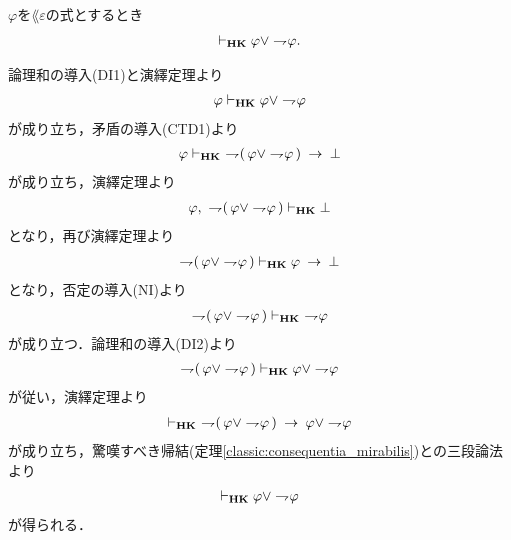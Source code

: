 	\begin{screen}
		\begin{thm}[排中律]\label{classic:law_of_excluded_middle}
			$\varphi$を$\lang{\varepsilon}$の式とするとき
			\begin{align}
				\vdash_{{\scriptsize \mbox{{\bf HK}}}} \varphi \vee \rightharpoondown\hspace{-0.25em} \varphi.
			\end{align}
		\end{thm}
	\end{screen}
	
	\begin{sketch}
		論理和の導入(DI1)と演繹定理より
		\begin{align}
			\varphi \vdash_{{\scriptsize \mbox{{\bf HK}}}} \varphi \vee \rightharpoondown\hspace{-0.25em} \varphi
		\end{align}
		が成り立ち，矛盾の導入(CTD1)より
		\begin{align}
			\varphi \provable{\mbox{{\bf HK}}}\ 
			\negation (\, \varphi \vee \negation \varphi\, ) \rarrow \bot
		\end{align}
		が成り立ち，演繹定理より
		\begin{align}
			\varphi,\ \rightharpoondown\hspace{-0.25em} (\, \varphi \vee \rightharpoondown\hspace{-0.25em} \varphi\, )
			\vdash_{{\scriptsize \mbox{{\bf HK}}}} \bot
		\end{align}
		となり，再び演繹定理より
		\begin{align}
			\rightharpoondown\hspace{-0.25em} (\, \varphi \vee \rightharpoondown\hspace{-0.25em} \varphi\, )
			\vdash_{{\scriptsize \mbox{{\bf HK}}}} \varphi \hspace{0.25em}\rightarrow\hspace{0.25em} \bot
		\end{align}
		となり，否定の導入(NI)より
		\begin{align}
			\rightharpoondown\hspace{-0.25em} (\, \varphi \vee \rightharpoondown\hspace{-0.25em} \varphi\, )
			\vdash_{{\scriptsize \mbox{{\bf HK}}}}\ \rightharpoondown\hspace{-0.25em} \varphi
		\end{align}
		が成り立つ．論理和の導入(DI2)より
		\begin{align}
			\rightharpoondown\hspace{-0.25em} (\, \varphi \vee \rightharpoondown\hspace{-0.25em} \varphi\, )
			\vdash_{{\scriptsize \mbox{{\bf HK}}}} \varphi \vee \rightharpoondown\hspace{-0.25em} \varphi
		\end{align}
		が従い，演繹定理より
		\begin{align}
			\provable{\mbox{{\bf HK}}}\ 
			\negation (\, \varphi \vee \negation \varphi\, )
			\rarrow \varphi \vee \negation \varphi
		\end{align}
		が成り立ち，驚嘆すべき帰結(定理\ref{classic:consequentia_mirabilis})との三段論法より
		\begin{align}
			\vdash_{{\scriptsize \mbox{{\bf HK}}}} \varphi \vee \rightharpoondown\hspace{-0.25em} \varphi
		\end{align}
		が得られる．
		\QED
	\end{sketch}
	
